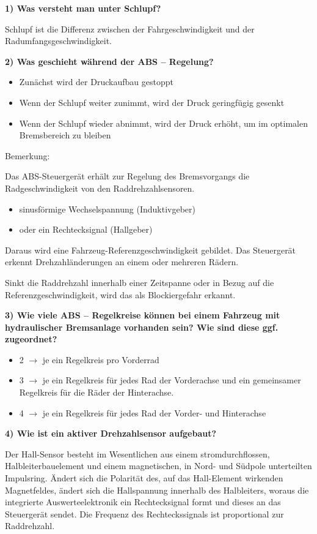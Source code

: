 \textbf{1) Was versteht man unter Schlupf?}

Schlupf ist die Differenz zwischen der Fahrgeschwindigkeit und der
Radumfangsgeschwindigkeit.

\textbf{2) Was geschieht während der ABS -- Regelung?}

\begin{itemize}
\item
  Zunächst wird der Druckaufbau gestoppt
\item
  Wenn der Schlupf weiter zunimmt, wird der Druck geringfügig gesenkt
\item
  Wenn der Schlupf wieder abnimmt, wird der Druck erhöht, um im
  optimalen Bremsbereich zu bleiben
\end{itemize}

Bemerkung:

Das ABS-Steuergerät erhält zur Regelung des Bremsvorgangs die
Radgeschwindigkeit von den Raddrehzahlsensoren.

\begin{itemize}
\item
  sinusförmige Wechselspannung (Induktivgeber)
\item
  oder ein Rechtecksignal (Hallgeber)
\end{itemize}

Daraus wird eine Fahrzeug-Referenzgeschwindigkeit gebildet. Das
Steuergerät erkennt Drehzahländerungen an einem oder mehreren Rädern.

Sinkt die Raddrehzahl innerhalb einer Zeitspanne oder in Bezug auf die
Referenzgeschwindigkeit, wird das als Blockiergefahr erkannt.

\textbf{3) Wie viele ABS -- Regelkreise können bei einem Fahrzeug mit
hydraulischer Bremsanlage vorhanden sein? Wie sind diese ggf.
zugeordnet?}

\begin{itemize}
\item
  2 $\to$ je ein Regelkreis pro Vorderrad
\item
  3 $\to$ je ein Regelkreis für jedes Rad der Vorderachse und ein
  gemeinsamer Regelkreis für die Räder der Hinterachse.
\item
  4 $\to$ je ein Regelkreis für jedes Rad der Vorder- und Hinterachse
\end{itemize}

\textbf{4) Wie ist ein aktiver Drehzahlsensor aufgebaut?}

Der Hall-Sensor besteht im Wesentlichen aus einem stromdurchflossen,
Halbleiterbauelement und einem magnetischen, in Nord- und Südpole
unterteilten Impulsring. Ändert sich die Polarität des, auf das
Hall-Element wirkenden Magnetfeldes, ändert sich die Hallspannung
innerhalb des Halbleiters, woraus die integrierte Auswerteelektronik ein
Rechtecksignal formt und dieses an das Steuergerät sendet. Die Frequenz
des Rechteckssignals ist proportional zur Raddrehzahl.

